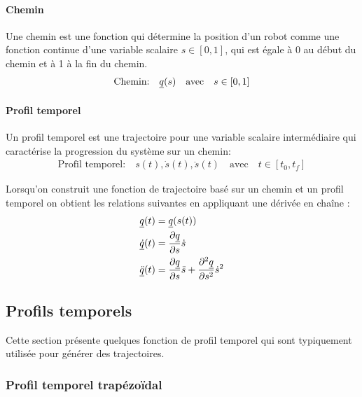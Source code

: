 \paragraph{Chemin} Une chemin est une fonction qui détermine la position d'un robot comme une fonction continue d'une variable scalaire $s \in [0,1]$, qui est égale à 0 au début du chemin et à 1 à la fin du chemin. 
\begin{align}
    \text{Chemin:} \quad \underline{q}(s) \quad \text{avec} \quad s \in [0,1]
\end{align}

\paragraph{Profil temporel}  Un profil temporel est une trajectoire pour une variable scalaire intermédiaire qui caractérise la progression du système sur un chemin:
\begin{align}
    \text{Profil temporel:} \quad s(t), \dot{s}(t), \ddot{s}(t) \quad \text{avec} \quad t \in [t_0,t_f]
\end{align}

Lorsqu'on construit une fonction de trajectoire basé sur un chemin et un profil temporel on obtient les relations suivantes en appliquant une dérivée en chaîne :
\begin{align}
    \underline{q}(t)       &=  \underline{q}(s(t))\\
    \underline{\dot{q}}(t) &= \frac{\partial \underline{q}}{ \partial s}  \dot{s}    \\
    \underline{\ddot{q}}(t)&= \frac{\partial \underline{q}}{ \partial s}  \ddot{s} + \frac{\partial^2 \underline{q}}{ \partial s^2}  \dot{s}^2
\end{align}


\subsection{Profils temporels}

Cette section présente quelques fonction de profil temporel qui sont typiquement utilisée pour générer des trajectoires.

\subsubsection{Profil temporel trapézoïdal}


